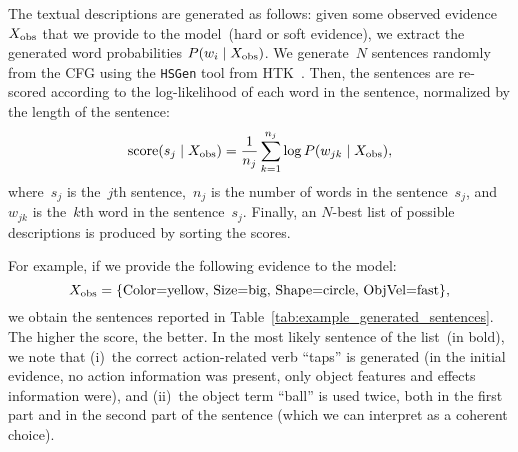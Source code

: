 The textual descriptions are generated as follows: given some observed evidence~$X_\text{obs}$ that we provide to the model~(hard or soft evidence), we extract the generated word probabilities
$P(w_i \mid X_\text{obs})$.
We generate~$N$ sentences randomly from the \ac{CFG} using the \texttt{HSGen} tool from HTK~\cite{young:htkbook}.
Then, the sentences are re-scored according to the log-likelihood of each word in the sentence, normalized by the length of the sentence:
\begin{equation} \label{eq:sentence_score}
  \text{score}(s_j \given \xobs) = \frac{1}{n_j} \sum_{k=1}^{n_j} \log P(w_{jk} \given \xobs),
\end{equation}
where~$s_j$ is the~$j$th sentence,~$n_j$ is the number of words in the sentence~$s_j$, and~$w_{jk}$ is the~$k$th word in the sentence~$s_j$.
Finally, an $N$-best list of possible descriptions is produced by sorting the scores.


For example, if we provide the following evidence to the model:
\begin{equation} \label{eq:evidence_example}
    \xobs = \{\text{Color=yellow, Size=big, Shape=circle, ObjVel=fast}\},
\end{equation}
we obtain
the sentences reported in Table~\ref{tab:example_generated_sentences}.
The higher the score, the better.
In the most likely sentence of the list~(in bold), we note that (i)~the correct action-related verb ``taps'' is generated (in the initial evidence, no action information was present, only object features and effects information were), and (ii)~the object term ``ball'' is used twice, both in the first part and in the second part of the sentence (which we can interpret as a coherent choice).


